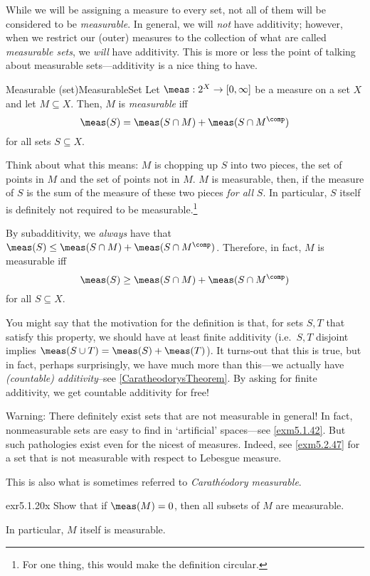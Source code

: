 While we will be assigning a measure to every set, not all of them will be considered to be \emph{measurable}.  In general, we will \emph{not} have additivity; however, when we restrict our (outer) measures to the collection of what are called \emph{measurable sets}, we \emph{will} have additivity.  This is more or less the point of talking about measurable sets---additivity is a nice thing to have.
\begin{dfn}{Measurable (set)}{MeasurableSet}
Let $\meas :2^X\rightarrow [0,\infty ]$ be a measure on a set $X$ and let $M\subseteq X$.  Then, $M$ is \emph{measurable} iff
\begin{equation}
\meas (S)=\meas (S\cap M)+\meas (S\cap M^{\comp})
\end{equation}
for all sets $S\subseteq X$.
\begin{rmk}
Think about what this means:  $M$ is chopping up $S$ into two pieces, the set of points in $M$ and the set of points not in $M$.  $M$ is measurable, then, if the measure of $S$ is the sum of the measure of these two pieces \emph{for all} $S$.  In particular, $S$ itself is definitely not required to be measurable.\footnote{For one thing, this would make the definition circular.}
\end{rmk}
\begin{rmk}
By subadditivity, we \emph{always} have that $\meas (S)\leq \meas (S\cap M)+\meas (S\cap M^{\comp})$.  Therefore, in fact, $M$ is measurable iff
\begin{equation}
\meas (S)\geq \meas (S\cap M)+\meas (S\cap M^{\comp})
\end{equation}
for all $S\subseteq X$.
\end{rmk}
\begin{rmk}
You might say that the motivation for the definition is that, for sets $S,T$ that satisfy this property, we should have at least finite additivity (i.e.~$S,T$ disjoint implies $\meas (S\cup T)=\meas (S)+\meas (T)$).  It turns-out that this is true, but in fact, perhaps surprisingly, we have much more than this---we actually have \emph{(countable) additivity}--see \cref{CaratheodorysTheorem}.  By asking for finite additivity, we get countable additivity for free!
\end{rmk}
\begin{wrn}
Warning:  There definitely exist sets that are not measurable in general!  In fact, nonmeasurable sets are easy to find in `artificial' spaces---see \cref{exm5.1.42}.  But such pathologies exist even for the nicest of measures.  Indeed, see \cref{exm5.2.47} for a set that is not measurable with respect to Lebesgue measure.
\end{wrn}
\begin{rmk}
This is also what is sometimes referred to \emph{Carathéodory measurable}.
\end{rmk}
\end{dfn}
\begin{exr}{}{exr5.1.20x}
Show that if $\meas (M)=0$, then all subsets of $M$ are measurable.
\begin{rmk}
In particular, $M$ itself is measurable.
\end{rmk}
\end{exr}

